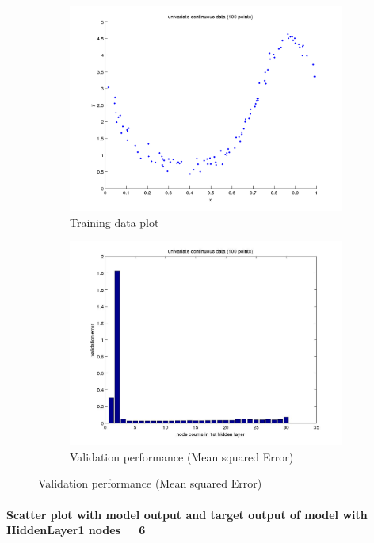 \documentclass[fleqn]{article}
\newcommand{\myparagraph}[1]{\paragraph{#1}\mbox{}\\}
\begin{document}
\begin{figure}[!ht]
\begin{subfigure}{.5\textwidth}
  \caption{Training data plot}
\includegraphics[scale=0.5]{pics/univariate100/dataPlot}
\end{subfigure}
\begin{subfigure}{.5\textwidth}
\caption{Validation performance (Mean squared Error)}
\includegraphics[scale=0.2]{pics/univariate100/univariate continuous data (100 points)_validationerror}
\end{subfigure}
\end{figure}

\newpage
\myparagraph{Scatter plot with model output and target output of model with HiddenLayer1 nodes = 6}
\end{document}
